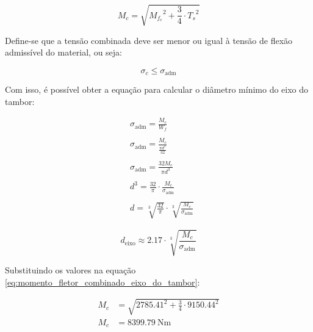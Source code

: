 \begin{equation}
  M_c = \sqrt{{M_{f_e}}^2 + \frac{3}{4} \cdot {T_s}^2}
  \label{eq:momento_fletor_combinado_eixo_do_tambor}
\end{equation}

Define-se que a tensão combinada deve ser menor ou igual à tensão de flexão admissível do material, ou seja:

\begin{equation*}
  \sigma_c \le \sigma_{\text{adm}}
\end{equation*}

Com isso, é possível obter a equação para calcular o diâmetro mínimo do eixo do tambor:

\begin{align*}
   & \sigma_{\text{adm}} = \frac{M_c}{W_f}                                        \\
   &                                                                              \\
   & \sigma_{\text{adm}} = \frac{M_c}{\frac{\pi d^3}{32}}                         \\
   &                                                                              \\
   & \sigma_{\text{adm}} = \frac{32 M_c}{\pi d^3}                                 \\
   &                                                                              \\
   & d^3 = \frac{32}{\pi} \cdot \frac{M_c}{\sigma_{\text{adm}}}                   \\
   &                                                                              \\
   & d = \sqrt[3]{\frac{32}{\pi}} \cdot \sqrt[3]{\frac{M_c}{\sigma_{\text{adm}}}}
\end{align*}

\begin{equation}
  d_{\text{eixo}} \approx \num{2.17} \cdot \sqrt[3]{\frac{M_c}{\sigma_{\text{adm}}}}
  \label{eq:diametro_eixo_do_tambor}
\end{equation}

\vspace{1em}

Substituindo os valores na equação \eqref{eq:momento_fletor_combinado_eixo_do_tambor}:

\begin{align*}
  M_c & = \sqrt{\num{2785.41}^2 + \frac{3}{4} \cdot \num{9150.44}^2} \\
  M_c & = \boxed{\SI{8399.79}{\newton\meter}}
\end{align*}


